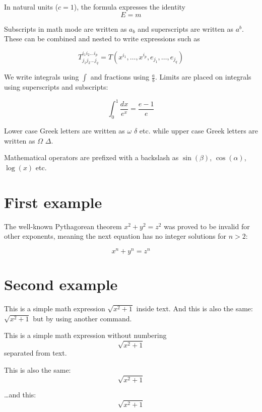 \documentclass[10pt, a4paper]{article}
\begin{document}
In natural units ($c = 1$), the formula expresses the identity
\begin{equation}
    E=m
\end{equation}

Subscripts in math mode are written as $a_b$ and superscripts are written as $a^b$. These can be combined and nested to write expressions such as

\[ T^{i_1 i_2 \dots i_p}_{j_1 j_2 \dots j_q} = T(x^{i_1},\dots,x^{i_p},e_{j_1},\dots,e_{j_q}) \]

We write integrals using $\int$ and fractions using $\frac{a}{b}$. Limits are placed on integrals using superscripts and subscripts:

\[ \int_0^1 \frac{dx}{e^x} =  \frac{e-1}{e} \]

Lower case Greek letters are written as $\omega$ $\delta$ etc. while upper case Greek letters are written as $\Omega$ $\Delta$.

Mathematical operators are prefixed with a backslash as $\sin(\beta)$, $\cos(\alpha)$, $\log(x)$ etc.

\section{First example}

The well-known Pythagorean theorem \(x^2 + y^2 = z^2\) was proved to be invalid for other exponents, meaning the next equation has no integer solutions for \(n>2\):

\[ x^n + y^n = z^n \]

\section{Second example}

This is a simple math expression \(\sqrt{x^2+1}\) inside text.
And this is also the same:
\begin{math}
    \sqrt{x^2+1}
\end{math}
but by using another command.

This is a simple math expression without numbering
\[\sqrt{x^2+1}\]
separated from text.

This is also the same:
\begin{displaymath}
    \sqrt{x^2+1}
\end{displaymath}

\ldots and this:
\begin{equation*}
    \sqrt{x^2+1}
\end{equation*}
\end{document}
